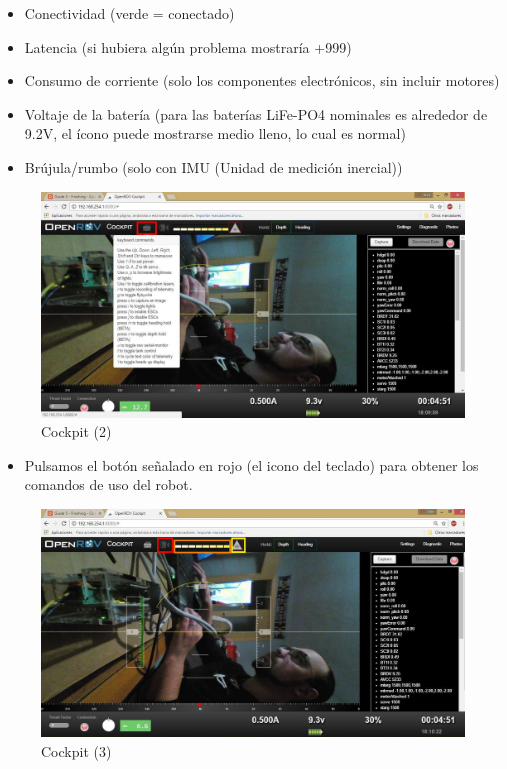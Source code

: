 \begin{itemize}
\item[\textcolor{red}{\textbullet}]Conectividad (verde = conectado)
\item[\textcolor{orange}{\textbullet}]Latencia (si hubiera algún problema mostraría +999)
\item[\textcolor{yellow}{\textbullet}]Consumo de corriente (solo los componentes electrónicos, sin incluir motores)
\item[\textcolor{green}{\textbullet}]Voltaje de la batería (para las baterías LiFe-PO4 nominales es alrededor de 9.2V, el ícono puede mostrarse medio lleno, lo cual es normal)
\item[\textcolor{blue}{\textbullet}]Brújula/rumbo (solo con IMU (Unidad de medición inercial))
\end{itemize}

\begin{figure} [hbtp]
\begin{center}
  \includegraphics[width=12cm]{img/cap3/3_5/cockpit2}
\end{center}
\caption{Cockpit (2)}
\label{fig:cockpit2}
\end{figure}

\begin{itemize}
\item[\textcolor{red}{\textbullet}]Pulsamos el botón señalado en rojo (el icono del teclado) para obtener los comandos de uso del robot.
\end{itemize}


\begin{figure} [hbtp]
\begin{center}
  \includegraphics[width=12cm]{img/cap3/3_5/cockpit3}
\end{center}
\caption{Cockpit (3)}
\label{fig:cockpit3}
\end{figure}

